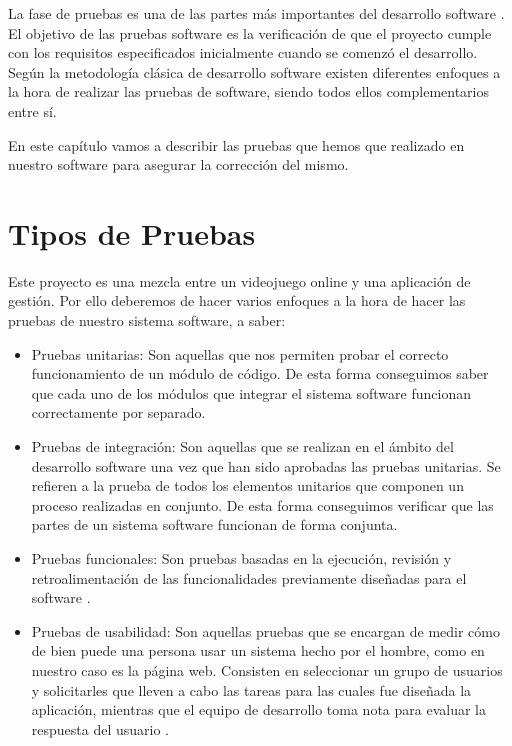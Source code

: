 

La fase de pruebas es una de las partes más importantes del desarrollo software
\cite{test:myers}. El objetivo de las pruebas software es la verificación de que
el proyecto cumple con los requisitos especificados inicialmente cuando se
comenzó el desarrollo. Según la metodología clásica de desarrollo software
existen diferentes enfoques a la hora de realizar las pruebas de software,
siendo todos ellos complementarios entre sí.

En este capítulo vamos a describir las pruebas que hemos que realizado en
nuestro software para asegurar la corrección del mismo.

\section{Tipos de Pruebas}
Este proyecto es una mezcla entre un videojuego online y una aplicación de
gestión. Por ello deberemos de hacer varios enfoques a la hora de hacer las
pruebas de nuestro sistema software, a saber:

\begin{itemize}
\item Pruebas unitarias: Son aquellas que nos permiten probar el correcto
  funcionamiento de un módulo de código. De esta forma conseguimos saber que
  cada uno de los módulos que integrar el sistema software funcionan
  correctamente por separado. \cite{test:unitaria}
\item Pruebas de integración: Son aquellas que se realizan en el ámbito del
  desarrollo software una vez que han sido aprobadas las pruebas unitarias. Se
  refieren a la prueba de todos los elementos unitarios que componen un proceso
  realizadas en conjunto. De esta forma conseguimos verificar que las partes de
  un sistema software funcionan de forma conjunta. \cite{test:integracion}
\item Pruebas funcionales: Son pruebas basadas en la ejecución, revisión y
  retroalimentación de las funcionalidades previamente diseñadas para el
  software \cite{test:funcionales}.
\item Pruebas de usabilidad: Son aquellas pruebas que se encargan de
  medir cómo de bien puede una persona usar un sistema hecho por el hombre, como
  en nuestro caso es la página web. Consisten en seleccionar un grupo de
  usuarios y solicitarles que lleven a cabo las tareas para las cuales fue
  diseñada la aplicación, mientras que el equipo de desarrollo toma nota para
  evaluar la respuesta del usuario \cite{test:usability}.
\end{itemize}

